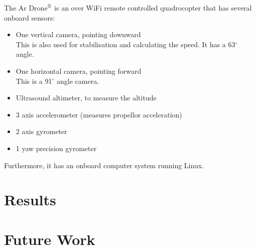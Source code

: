 \documentclass[a4paper,10pt]{article}
\newcommand{\Ardrone}{Ar Drone$^{\copyright}$ }
\begin{document}
The \Ardrone is an over WiFi remote controlled quadrocopter that has several onboard sensors:
\begin{itemize}
	\item One vertical camera, pointing downward \\ This is also used for stabilisation and calculating the speed. It has a 63$^{\circ}$ angle.
	\item One horizontal camera, pointing forward \\ This is a 91$^{\circ}$ angle camera.
	\item Ultrasound altimeter, to measure the altitude
    \item 3 axis accelerometer (measures propellor acceleration)
    \item 2 axis gyrometer 
    \item 1 yaw precision gyrometer
\end{itemize}
Furthermore, it has an onboard computer system running Linux. 







\section{Results}

\section{Future Work}
\end{document}
